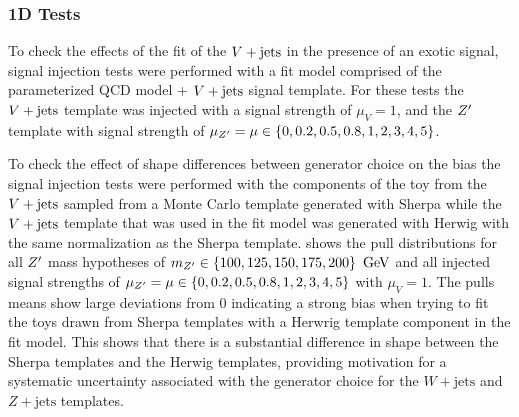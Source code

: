 \subsubsection{1D Tests}
To check the effects of the fit of the $V + \text{jets}$ in the presence of an exotic signal, signal injection tests were performed with a fit model comprised of the parameterized QCD model + $V + \text{jets}$ signal template.
For these tests the $V + \text{jets}$ template was injected with a signal strength of $\mu_{V} = 1$, and the $Z'$ template with signal strength of $\mu_{Z'} = \mu \in \left\{0, 0.2, 0.5, 0.8, 1, 2, 3, 4, 5\right\}$.

To check the effect of shape differences between generator choice on the bias the signal injection tests were performed with the components of the toy from the $V + \text{jets}$ sampled from a Monte Carlo template generated with Sherpa while the $V + \text{jets}$ template that was used in the fit model was generated with Herwig with the same normalization as the Sherpa template.
 shows the pull distributions for all $Z'$ mass hypotheses of $m_{Z'} \in \left\{100, 125, 150, 175, 200\right\}~\mathrm{GeV}$ and all injected signal strengths of $\mu_{Z'} = \mu \in \left\{0, 0.2, 0.5, 0.8, 1, 2, 3, 4, 5\right\}$ with $\mu_{V} = 1$.
The pulls means show large deviations from $0$ indicating a strong bias when trying to fit the toys drawn from Sherpa templates with a Herwrig template component in the fit model.
This shows that there is a substantial difference in shape between the Sherpa templates and the Herwig templates, providing motivation for a systematic uncertainty associated with the generator choice for the $W+\mathrm{jets}$ and $Z+\mathrm{jets}$ templates.


